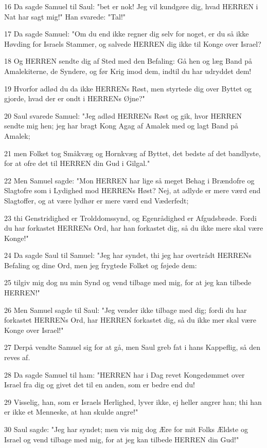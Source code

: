 \par 16 Da sagde Samuel til Saul: "bet er nok! Jeg vil kundgøre dig, hvad HERREN i Nat har sagt mig!" Han svarede: "Tal!"
\par 17 Da sagde Samuel: "Om du end ikke regner dig selv for noget, er du så ikke Høvding for Israels Stammer, og salvede HERREN dig ikke til Konge over Israel?
\par 18 Og HERREN sendte dig af Sted med den Befaling: Gå hen og læg Band på Amalekiterne, de Syndere, og før Krig imod dem, indtil du har udryddet dem!
\par 19 Hvorfor adlød du da ikke HERRENs Røst, men styrtede dig over Byttet og gjorde, hvad der er ondt i HERRENs Øjne?"
\par 20 Saul svarede Samuel: "Jeg adlød HERRENs Røst og gik, hvor HERREN sendte mig hen; jeg har bragt Kong Agag af Amalek med og lagt Band på Amalek;
\par 21 men Folket tog Småkvæg og Hornkvæg af Byttet, det bedste af det bandlyste, for at ofre det til HERREN din Gud i Gilgal."
\par 22 Men Samuel sagde: "Mon HERREN har lige så meget Behag i Brændofre og Slagtofre som i Lydighed mod HERRENs Høst? Nej, at adlyde er mere værd end Slagtoffer, og at være lydhør er mere værd end Væderfedt;
\par 23 thi Genstridighed er Trolddomssynd, og Egenrådighed er Afgudsbrøde. Fordi du har forkastet HERRENs Ord, har han forkastet dig, så du ikke mere skal være Konge!"
\par 24 Da sagde Saul til Samuel: "Jeg har syndet, thi jeg har overtrådt HERRENs Befaling og dine Ord, men jeg frygtede Folket og føjede dem:
\par 25 tilgiv mig dog nu min Synd og vend tilbage med mig, for at jeg kan tilbede HERREN!"
\par 26 Men Samuel sagde til Saul: "Jeg vender ikke tilbage med dig; fordi du har forkastet HERRENs Ord, har HERREN forkastet dig, så du ikke mer skal være Konge over Israel!"
\par 27 Derpå vendte Samuel sig for at gå, men Saul greb fat i hans Kappeflig, så den reves af.
\par 28 Da sagde Samuel til ham: "HERREN har i Dag revet Kongedømmet over Israel fra dig og givet det til en anden, som er bedre end du!
\par 29 Visselig, han, som er Israels Herlighed, lyver ikke, ej heller angrer han; thi han er ikke et Menneske, at han skulde angre!"
\par 30 Saul sagde: "Jeg har syndet; men vis mig dog Ære for mit Folks Ældste og Israel og vend tilbage med mig, for at jeg kan tilbede HERREN din Gud!"

